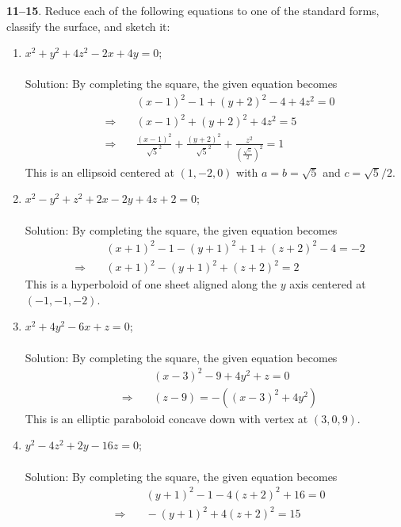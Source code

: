 \documentclass[12pt]{amsbook}
\begin{document}
{\small\bf 11--15}. Reduce each of the following equations to one of the
standard forms, classify the surface, and sketch it:
\begin{enumerate}
\item[{\small\bf 11}.]\quad 
$x^2+y^2+4z^2-2x +4y =0$; 
\\
\\
{\sc Solution}:
By completing the square, the given equation becomes
\begin{eqnarray*}
&&\quad (x-1)^2-1+(y+2)^2-4+4z^2=0\\
&\Rightarrow&\quad
(x-1)^2+(y+2)^2+4z^2=5
\\
&\Rightarrow&\quad
\frac{(x-1)^2}{\sqrt{5}^2}+\frac{(y+2)^2}{\sqrt{5}^2}+\frac{z^2}{(\frac{\sqrt{5}}{2})^2}=1
\end{eqnarray*}
This is an ellipsoid centered at $(1,-2,0)$ with $a=b=\sqrt{5}$ and $c= \sqrt{5}/2$. 
\\
\item[{\small\bf 12}.]\quad  $x^2-y^2+z^2+2x-2y+4z+2=0$;
\\
\\
{\sc Solution}:
By completing the square, the given equation becomes
\begin{eqnarray*}
&&\quad (x+1)^2-1-(y+1)^2+1+(z+2)^2-4=-2\\
&\Rightarrow&\quad
(x+1)^2-(y+1)^2+(z+2)^2=2
\end{eqnarray*}
This is a hyperboloid of one sheet aligned along the $y$ axis centered at $(-1,-1,-2)$.
\\
\item[{\small\bf 13}.]\quad 
$x^2+4y^2-6x +z =0$;
\\
\\
{\sc Solution}:
By completing the square, the given equation becomes
\begin{eqnarray*}
&&\quad (x-3)^2-9+4y^2+z=0\\
&\Rightarrow&\quad
(z-9)=-((x-3)^2+4y^2)
\end{eqnarray*}
This is an elliptic paraboloid concave down with vertex at $(3,0,9)$.
\\
\item[{\small\bf 14}.]\quad  $y^2-4z^2+2y-16z=0$;
\\
\\
{\sc Solution}:
By completing the square, the given equation becomes
\begin{eqnarray*}
&&\quad (y+1)^2-1-4(z+2)^2+16=0\\
&\Rightarrow&\quad
-(y+1)^2+4(z+2)^2=15
\end{eqnarray*}

\end{enumerate}
\end{document}
